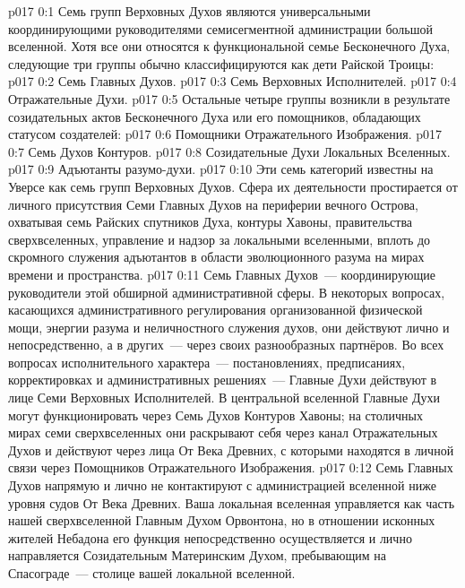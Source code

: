 \author{Божественный Советник}
\vs p017 0:1 Семь групп Верховных Духов являются универсальными координирующими руководителями семисегментной администрации большой вселенной. Хотя все они относятся к функциональной семье Бесконечного Духа, следующие три группы обычно классифицируются как дети Райской Троицы:
\vs p017 0:2 Семь Главных Духов.
\vs p017 0:3 Семь Верховных Исполнителей.
\vs p017 0:4 Отражательные Духи.
\vs p017 0:5 \pc Остальные четыре группы возникли в результате созидательных актов Бесконечного Духа или его помощников, обладающих статусом создателей:
\vs p017 0:6 Помощники Отражательного Изображения.
\vs p017 0:7 Семь Духов Контуров.
\vs p017 0:8 Созидательные Духи Локальных Вселенных.
\vs p017 0:9 Адъютанты разумо\hyp{}духи.
\vs p017 0:10 \pc Эти семь категорий известны на Уверсе как семь групп Верховных Духов. Сфера их деятельности простирается от личного присутствия Семи Главных Духов на периферии вечного Острова, охватывая семь Райских спутников Духа, контуры Хавоны, правительства сверхвселенных, управление и надзор за локальными вселенными, вплоть до скромного служения адъютантов в области эволюционного разума на мирах времени и пространства.
\vs p017 0:11 Семь Главных Духов~--- координирующие руководители этой обширной административной сферы. В некоторых вопросах, касающихся административного регулирования организованной физической мощи, энергии разума и неличностного служения духов, они действуют лично и непосредственно, а в других~--- через своих разнообразных партнёров. Во всех вопросах исполнительного характера~--- постановлениях, предписаниях, корректировках и административных решениях~--- Главные Духи действуют в лице Семи Верховных Исполнителей. В центральной вселенной Главные Духи могут функционировать через Семь Духов Контуров Хавоны; на столичных мирах семи сверхвселенных они раскрывают себя через канал Отражательных Духов и действуют через лица От Века Древних, с которыми находятся в личной связи через Помощников Отражательного Изображения.
\vs p017 0:12 Семь Главных Духов напрямую и лично не контактируют с администрацией вселенной ниже уровня судов От Века Древних. Ваша локальная вселенная управляется как часть нашей сверхвселенной Главным Духом Орвонтона, но в отношении исконных жителей Небадона его функция непосредственно осуществляется и лично направляется Созидательным Материнским Духом, пребывающим на Спасограде~--- столице вашей локальной вселенной.
